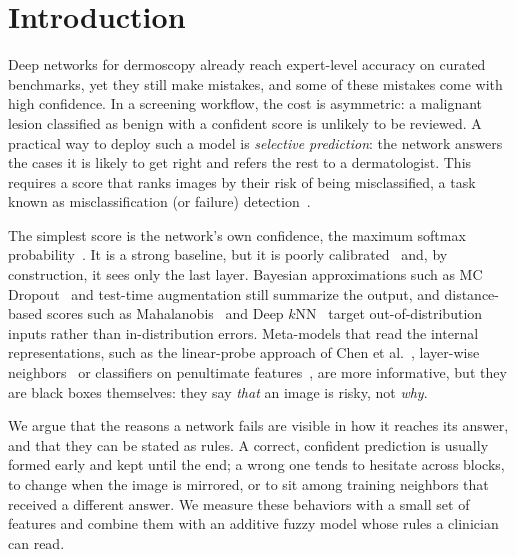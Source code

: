 \documentclass[conference,a4paper]{IEEEtran}
\begin{document}
\section{Introduction}

Deep networks for dermoscopy already reach expert-level accuracy on curated benchmarks, yet they still make mistakes, and some of these
mistakes come with high confidence. In a screening workflow, the cost is asymmetric: a malignant lesion classified as benign with a
confident score is unlikely to be reviewed. A practical way to deploy such a model is \emph{selective prediction}: the network answers
the cases it is likely to get right and refers the rest to a dermatologist. This requires a score that ranks images by their risk of
being misclassified, a task known as misclassification (or failure) detection~\cite{hendrycks2017,jaeger2023}.

The simplest score is the network's own confidence, the maximum softmax probability~\cite{hendrycks2017}. It is a strong baseline,
but it is poorly calibrated~\cite{guo2017} and, by construction, it sees only the last layer. Bayesian approximations such as
MC Dropout~\cite{gal2016} and test-time augmentation still summarize the output, and distance-based scores such as
Mahalanobis~\cite{lee2018} and Deep $k$NN~\cite{papernot2018} target out-of-distribution inputs rather than in-distribution errors.
Meta-models that read the internal representations, such as the linear-probe approach of Chen et al.~\cite{chen2019},
layer-wise neighbors~\cite{font2025} or classifiers on penultimate features~\cite{gorbett2022}, are more informative,
but they are black boxes themselves: they say \emph{that} an image is risky, not \emph{why}.

We argue that the reasons a network fails are visible in how it reaches its answer, and that they can be stated as rules.
A correct, confident prediction is usually formed early and kept until the end; a wrong one tends to hesitate across blocks,
to change when the image is mirrored, or to sit among training neighbors that received a different answer.
We measure these behaviors with a small set of features and combine them with an additive fuzzy model whose rules a clinician can read.
\end{document}
